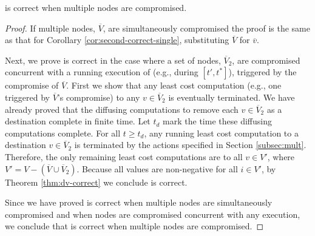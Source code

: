 \begin{corollary}
\label{cor:second-correct-mult}
\second is correct when multiple nodes are compromised.
\end{corollary}
\begin{proof}
If multiple nodes, $\overline{V}$, are simultaneously compromised the proof is the same as that for Corollary \ref{cor:second-correct-single}, substituting $\overline{V}$ for $\overline{v}$.

Next, we prove \second is correct in the case where a set of nodes, $\overline{V}_2$, are compromised concurrent with a running execution of \second (e.g., during  $[t',t^*]$), triggered by the compromise of $\overline{V}$.
First we show that any least cost computation (e.g., one triggered by  $\overline{V}$'s compromise) to any $v \in \overline{V}_2$ is eventually terminated.  We have already proved that the diffusing computations to remove each $v \in \overline{V}_2$ as 
a destination complete in finite time.  Let $t_d$ mark the time these diffusing computations complete. For all $t \geq t_d$, any running least cost computation to a destination $v \in \overline{V}_2$ 
is terminated by the actions specified in Section \ref{subsec:mult}.  Therefore, the only remaining least cost computations are to all $v \in V'$, where 
$V' = V - \left(\overline{V} \cup \overline{V}_2 \right)$.  Because all \dmatrixi values are non-negative for all $i \in V'$, by Theorem \ref{thm:dv-correct} we conclude \second is correct.

Since we have proved \second is correct when multiple nodes are simultaneously compromised and when nodes are compromised concurrent with any \second execution,
we conclude that \second is correct when multiple nodes are compromised.
\end{proof}


